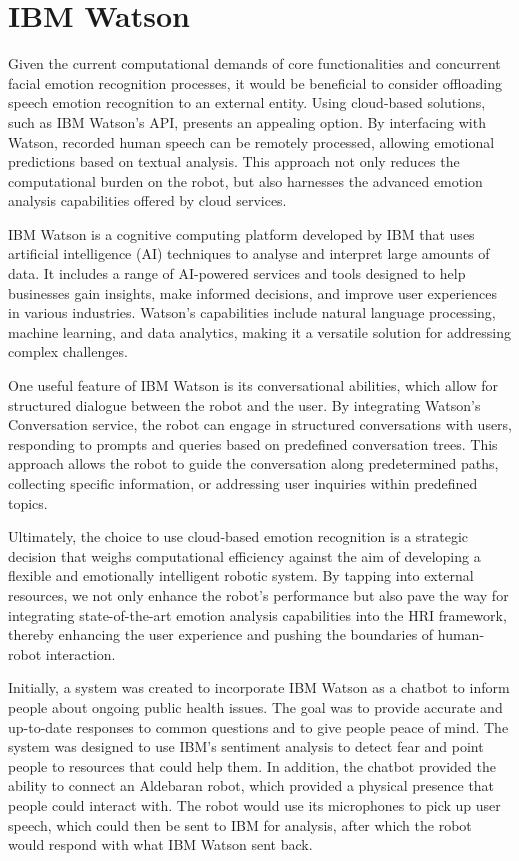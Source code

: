 \section{IBM Watson}

Given the current computational demands of core functionalities and concurrent facial emotion recognition processes, it would be beneficial to consider offloading speech emotion recognition to an external entity. Using cloud-based solutions, such as IBM Watson's API, presents an appealing option. By interfacing with Watson, recorded human speech can be remotely processed, allowing emotional predictions based on textual analysis. This approach not only reduces the computational burden on the robot, but also harnesses the advanced emotion analysis capabilities offered by cloud services.

IBM Watson is a cognitive computing platform developed by IBM that uses artificial intelligence (AI) techniques to analyse and interpret large amounts of data. It includes a range of AI-powered services and tools designed to help businesses gain insights, make informed decisions, and improve user experiences in various industries. Watson's capabilities include natural language processing, machine learning, and data analytics, making it a versatile solution for addressing complex challenges.

One useful feature of IBM Watson is its conversational abilities, which allow for structured dialogue between the robot and the user. By integrating Watson's Conversation service, the robot can engage in structured conversations with users, responding to prompts and queries based on predefined conversation trees. This approach allows the robot to guide the conversation along predetermined paths, collecting specific information, or addressing user inquiries within predefined topics.

Ultimately, the choice to use cloud-based emotion recognition is a strategic decision that weighs computational efficiency against the aim of developing a flexible and emotionally intelligent robotic system. By tapping into external resources, we not only enhance the robot's performance but also pave the way for integrating state-of-the-art emotion analysis capabilities into the HRI framework, thereby enhancing the user experience and pushing the boundaries of human-robot interaction. \cite{Kumar2022-gd}

Initially, a system was created to incorporate IBM Watson as a chatbot to inform people about ongoing public health issues. The goal was to provide accurate and up-to-date responses to common questions and to give people peace of mind. The system was designed to use IBM’s sentiment analysis to detect fear and point people to resources that could help them. In addition, the chatbot provided the ability to connect an Aldebaran robot, which provided a physical presence that people could interact with. The robot would use its microphones to pick up user speech, which could then be sent to IBM for analysis, after which the robot would respond with what IBM Watson sent back.

